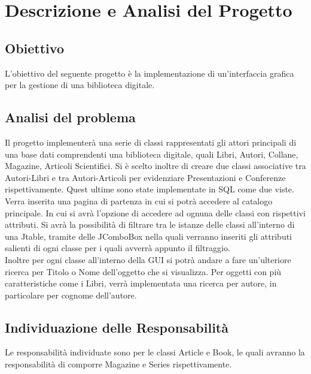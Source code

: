 \chapter{Descrizione e Analisi del Progetto}
\section{Obiettivo}

L'obiettivo del seguente progetto è la implementazione di un'interfaccia grafica per la gestione di una biblioteca digitale. 
\section{Analisi del problema}
Il progetto implementerà una serie di classi rappresentati gli attori principali di una base dati comprendenti una biblioteca digitale, quali Libri, Autori, Collane, Magazine, Articoli Scientifici. Si è scelto inoltre di creare due classi associative tra Autori-Libri e tra Autori-Articoli per evidenziare Presentazioni e Conferenze rispettivamente. Quest ultime sono state implementate in SQL come due viste. \\
Verra inserita una pagina di partenza in cui si potrà accedere al catalogo principale. In cui si avrà l'opzione di accedere ad ognuna delle classi con rispettivi attributi. Si avrà la possibilità di filtrare tra le istanze delle classi  all'interno di una Jtable, tramite delle JComboBox nella quali verranno inseriti gli attributi salienti di ogni classe per i quali avverrà appunto il filtraggio.\\
Inoltre per ogni classe all'interno della GUI si potrà andare a fare un'ulteriore ricerca per Titolo o Nome dell'oggetto che si visualizza. Per oggetti con più caratteristiche come i Libri, verrà implementata una ricerca per autore, in particolare per cognome dell'autore.

\section{Individuazione delle Responsabilità}
Le responsabilità individuate sono per le classi Article e Book, le quali avranno la responsabilità di comporre Magazine e Series rispettivamente.
\newpage